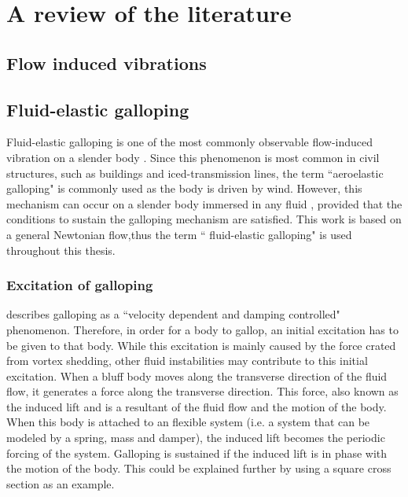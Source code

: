 \chapter{A review of the literature}

\section{Flow induced vibrations}
\label{sec:flow induced vibrations}


\section{Fluid-elastic galloping}
\label{fluid-elastic galloping}

Fluid-elastic galloping is one of the most commonly observable flow-induced vibration on a slender body . Since this phenomenon is most common in civil structures, such as buildings and iced-transmission lines, the term ``aeroelastic galloping" is commonly used as the body is driven by wind. However, this mechanism can occur on a slender body immersed in any fluid , provided that the conditions to sustain the galloping mechanism are satisfied. This work is based on a general Newtonian flow,thus the term `` fluid-elastic galloping" is used throughout this thesis.
   

\subsection{Excitation of galloping}
\label{sec:exci-galloping}

\citet{Paidoussis2010} describes galloping as a ``velocity dependent and damping controlled" phenomenon. Therefore, in order for a body to gallop, an initial excitation has to be given to that body. While this excitation is mainly caused by the force crated from vortex shedding, other fluid instabilities may contribute to this initial excitation.  When a bluff body moves along the transverse direction of the fluid flow, it generates a force along the transverse direction. This force, also known as the induced lift and is a resultant of the fluid flow and the motion of the body. When this body is attached to an flexible system (i.e. a system that can be modeled by a spring, mass and damper), the induced lift becomes the periodic forcing of the system. Galloping is sustained  if the induced lift is in phase with the motion of the body. This could be explained further by using a square cross section as an example.

